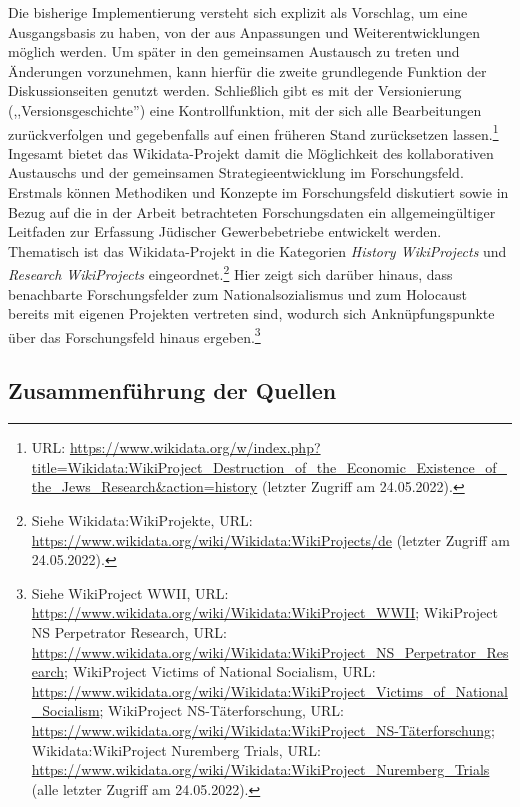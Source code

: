 Die bisherige Implementierung versteht sich explizit als Vorschlag, um eine Ausgangsbasis zu haben, von der aus Anpassungen und Weiterentwicklungen möglich werden. Um später in den gemeinsamen Austausch zu treten und Änderungen vorzunehmen, kann hierfür die zweite grundlegende Funktion der Diskussionseiten genutzt werden. Schließlich gibt es mit der Versionierung (,,Versionsgeschichte'') eine Kontrollfunktion, mit der sich alle Bearbeitungen zurückverfolgen und gegebenfalls auf einen früheren Stand zurücksetzen lassen.\footnote{URL: \url{https://www.wikidata.org/w/index.php?title=Wikidata:WikiProject_Destruction_of_the_Economic_Existence_of_the_Jews_Research&action=history} (letzter Zugriff am 24.05.2022).} Ingesamt bietet das Wikidata-Projekt damit die Möglichkeit des kollaborativen Austauschs und der gemeinsamen Strategieentwicklung im Forschungsfeld. Erstmals können Methodiken und Konzepte im Forschungsfeld diskutiert sowie in Bezug auf die in der Arbeit betrachteten Forschungsdaten ein allgemeingültiger Leitfaden zur Erfassung Jüdischer Gewerbebetriebe entwickelt werden. Thematisch ist das Wikidata-Projekt in die Kategorien \textit{History WikiProjects} und \textit{Research WikiProjects} eingeordnet.\footnote{Siehe Wikidata:WikiProjekte, URL: \url{https://www.wikidata.org/wiki/Wikidata:WikiProjects/de} (letzter Zugriff am 24.05.2022).} Hier zeigt sich darüber hinaus, dass benachbarte Forschungsfelder zum Nationalsozialismus und zum Holocaust bereits mit eigenen Projekten vertreten sind, wodurch sich Anknüpfungspunkte über das Forschungsfeld hinaus ergeben.\footnote{Siehe WikiProject WWII, URL: \url{https://www.wikidata.org/wiki/Wikidata:WikiProject\_WWII}; WikiProject NS Perpetrator Research, URL: \url{https://www.wikidata.org/wiki/Wikidata:WikiProject\_NS\_Perpetrator\_Research}; WikiProject Victims of National Socialism, URL: \url{https://www.wikidata.org/wiki/Wikidata:WikiProject\_Victims\_of\_National\_Socialism}; WikiProject NS-Täterforschung, URL: \url{https://www.wikidata.org/wiki/Wikidata:WikiProject\_NS-Täterforschung}; Wikidata:WikiProject Nuremberg Trials, URL: \url{https://www.wikidata.org/wiki/Wikidata:WikiProject\_Nuremberg\_Trials} (alle letzter Zugriff am 24.05.2022).} 

\subsection{Zusammenführung der Quellen}

